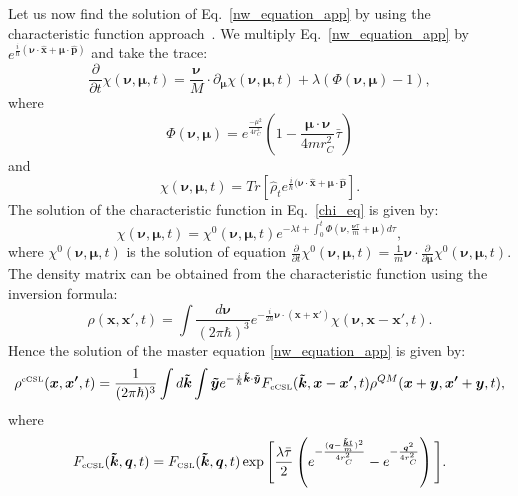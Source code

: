 \documentclass[12pt,groupedaddress,pra,aps]{revtex4-1}
\begin{document}
Let us now find the solution of Eq.~\eqref{nw_equation_app} by using the characteristic function approach~\cite{PhysRevA.82.042111}. We multiply Eq.~\eqref{nw_equation_app} by $e^{\frac{i}{\hbar} (\bm{\nu} \cdot \bm{\hat{x}} + \bm{\mu} \cdot \bm{\hat{p}})}$ and take the trace:
\begin{equation}\label{chi_eq}
\frac{\partial}{\partial t}\chi(\bm{\nu},\bm{\mu},t)= \frac{\bm{\nu}}{M} \cdot \partial_{\bm{\mu}}  \chi(\bm{\nu},\bm{\mu},t) 
+\lambda\left(\Phi(\bm{\nu},\bm{\mu}) -1\right),
\end{equation}
where
\begin{equation}
\Phi(\bm{\nu},\bm{\mu})=e^{\frac{-\mu^2}{4r_C^2}}(1-\frac{\bm{\mu} \cdot \bm{\nu}}{4mr_C^2}\bar{\tau} )
\end{equation}
and
\begin{equation}\label{chi_def}
\chi(\bm{\nu},\bm{\mu},t)= Tr[\hat{\rho}_t e^{\frac{i}{\hbar} (\bm{\nu} \cdot \bm{\hat{x}} + \bm{\mu} \cdot \bm{\hat{p}}}].
\end{equation}
The solution of the characteristic function in Eq.~\eqref{chi_eq} is given by:
\begin{equation}
\chi(\bm{\nu},\bm{\mu},t)= \chi^0(\bm{\nu},\bm{\mu},t)e^{-\lambda t
+ \int_0^t\Phi(\bm{\nu},\frac{\bm{\nu}\tau}{m}+\bm{\mu}) d\tau},
\end{equation}
where $\chi^0(\bm{\nu},\bm{\mu},t)$ is the solution of equation $\frac{\partial}{\partial t} \chi^0(\bm{\nu},\bm{\mu},t)= \frac{1}{m} \bm{\nu} \cdot \frac{\partial}{\partial  \bm{\mu}}\chi^0(\bm{\nu},\bm{\mu},t)$. 
The density matrix can be obtained from the characteristic function using the inversion formula:
\begin{equation}\label{inversion_formula}
\rho(\bm{x},\bm{x'},t)=\int \frac{d\bm{\nu}}{(2\pi\hbar)^3} 
e^{-\frac{i}{2\hbar} \bm{\nu} \cdot (\bm{x}+\bm{x'})} 
\chi(\bm{\nu},\bm{x}-\bm{x'},t).
\end{equation}
Hence the solution of the master equation \eqref{nw_equation_app} is given by:
\begin{equation}\label{Crho_grw_dp3}
\rho^{\text{\tiny cCSL}}(\bm{x},\bm{x'},t)=\frac{1}{(2\pi\hbar)^3} \int d\bm{\tilde{k}}  \int \bm{\tilde{y}} e^{-\frac{i}{\hbar}\bm{\tilde{k}} \cdot \bm{\tilde{y}}} 
F_{\text{\tiny cCSL}}(\bm{\tilde{k}},\bm{x}-\bm{x'},t) \rho^{QM}(\bm{x}+\bm{y},\bm{x'}+\bm{y},t),
\end{equation}
where
\begin{equation}\label{CFF_dp3}
F_{\text{\tiny cCSL}}(\bm{\tilde{k}},\bm{q},t)= F_{\text{\tiny CSL}}(\bm{\tilde{k}},\bm{q},t)
 \exp\Bigg[\frac{\lambda \bar{\tau}}{2}  \left(e^{-\frac{(\bm{q}-\frac{\bm{\tilde{k}}t}{m})^2}{4r_C^2}} - e^{-\frac{\bm{q}^2}{4r_C^2}}\right) \Bigg].
\end{equation}
\end{document}
